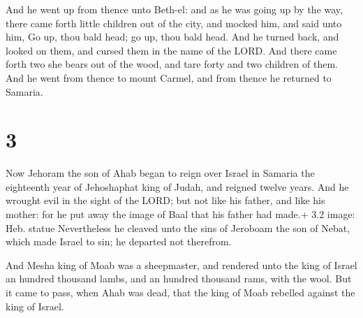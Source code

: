  And he went up from thence unto Beth-el: and as he was
going up by the way, there came forth little children out of the city,
and mocked him, and said unto him, Go up, thou bald head; go up, thou
bald head.  And he turned back, and looked on them, and
cursed them in the name of the LORD. And there came forth two she bears
out of the wood, and tare forty and two children of them. 
And he went from thence to mount Carmel, and from thence he returned to
Samaria.

\hypertarget{section-2}{%
\section{3}\label{section-2}}

 Now Jehoram the son of Ahab began to reign over Israel in
Samaria the eighteenth year of Jehoshaphat king of Judah, and reigned
twelve years.  And he wrought evil in the sight of the LORD;
but not like his father, and like his mother: for he put away the image
of Baal that his father had made.+ 3.2 image: Heb. statue 
Nevertheless he cleaved unto the sins of Jeroboam the son of Nebat,
which made Israel to sin; he departed not therefrom.

 And Mesha king of Moab was a sheepmaster, and rendered
unto the king of Israel an hundred thousand lambs, and an hundred
thousand rams, with the wool.  But it came to pass, when
Ahab was dead, that the king of Moab rebelled against the king of
Israel.

